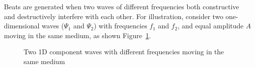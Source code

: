 %
%
%
%
%
%
%
Beats are generated when two waves of different frequencies both constructive
and destructively interfere with each other. For illustration, consider two
one-dimensional waves ({\color{magenta}$\Psi_1$} and {\color{cyan}$\Psi_2$})
with frequencies $f_1$ and $f_2$, and equal amplitude $A$ moving in the same
medium, as shown Figure~\ref{fig:component-waves}.
\begin{figure}[ht]
  \centering
  \caption{Two 1D component waves with different frequencies moving in the same
    medium}
  \label{fig:component-waves}
\end{figure}

